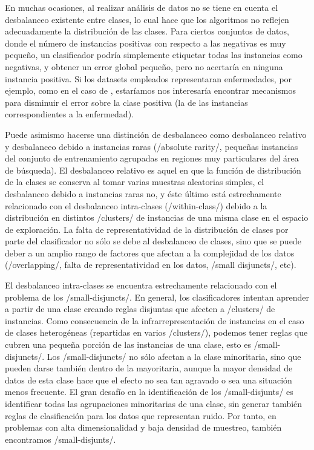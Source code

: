 En muchas ocasiones, al realizar análisis de datos no se tiene en cuenta el desbalanceo existente entre clases, lo
cual hace que los algoritmos no reflejen adecuadamente la distribución de las clases. Para ciertos conjuntos de datos,
donde el número de instancias positivas con respecto a las negativas es muy pequeño, un clasificador podría simplemente
etiquetar todas las instancias como negativas, y obtener un error global pequeño, pero no acertaría en ninguna instancia
positiva. Si los datasets empleados representaran enfermedades, por ejemplo, como en el caso de \cite{keelderma}, estaríamos
nos interesaría encontrar mecanismos para disminuir el error sobre la clase positiva (la de las instancias correspondientes
a la enfermedad).

Puede asimismo hacerse una distinción de desbalanceo como desbalanceo relativo y desbalanceo debido a instancias
raras (/absolute rarity/, pequeñas instancias del conjunto de entrenamiento agrupadas en regiones muy particulares
del área de búsqueda). El desbalanceo relativo es aquel en que la función de distribución de la clases se conserva 
al tomar varias muestras aleatorias simples, el desbalanceo debido a instancias raras no, y éste último está
estrechamente relacionado con el desbalanceo intra-clases (/within-class/) debido a la distribución en distintos
/clusters/ de instancias de una misma clase en el espacio de exploración. La falta de representatividad de la 
distribución de clases por parte del clasificador no sólo se debe al desbalanceo de clases, sino que se puede deber
a un amplio rango de factores que afectan a la complejidad de los datos (/overlapping/, falta de representatividad
en los datos, /small disjuncts/, etc).

El desbalanceo intra-clases se encuentra estrechamente relacionado con el problema de los /small-disjuncts/. En 
general, los clasificadores intentan aprender a partir de una clase creando reglas disjuntas que afecten a /clusters/ 
de instancias. Como consecuencia de la infrarrepresentación de instancias en el caso de clases heterogéneas (repartidas 
en varios /clusters/), podemos tener reglas que cubren una pequeña porción de las instancias de una clase, esto es 
/small-disjuncts/. Los /small-disjuncts/ no sólo afectan a la clase minoritaria, sino que pueden darse también 
dentro de la mayoritaria, aunque la mayor densidad de datos de esta clase hace que el efecto no sea tan agravado o 
sea una situación menos frecuente. El gran desafío en la identificación de los /small-disjunts/ es identificar todas las
agrupaciones minoritarias de una clase, sin generar también reglas de clasificación para los datos que representan ruido.
Por tanto, en problemas con alta dimensionalidad y baja densidad de muestreo, también encontramos /small-disjunts/.
